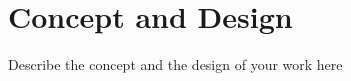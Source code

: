 \chapter{Concept and Design}
\label{cha:conceptanddesign}

Describe the concept and the design of your work here